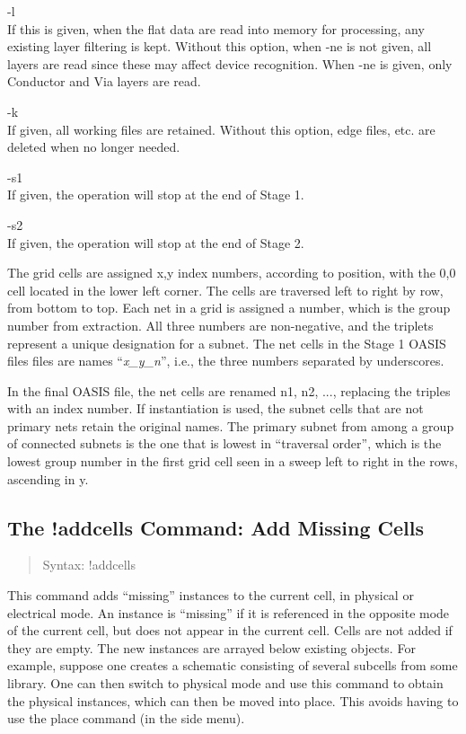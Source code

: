\begin{description}
\item{\vt -l}\\
If this is given, when the flat data are read into memory for
processing, any existing layer filtering is kept.  Without this
option, when {\vt -ne} is not given, all layers are read since these
may affect device recognition.  When {\vt -ne} is given, only
{\et Conductor} and {\et Via} layers are read.

\item{\vt -k}\\
If given, all working files are retained.  Without this option, edge
files, etc.  are deleted when no longer needed.

\item{\vt -s1}\\
If given, the operation will stop at the end of Stage 1.

\item{\vt -s2}\\
If given, the operation will stop at the end of Stage 2.
\end{description}

The grid cells are assigned x,y index numbers, according to position,
with the 0,0 cell located in the lower left corner.  The cells are
traversed left to right by row, from bottom to top.  Each net in a
grid is assigned a number, which is the group number from extraction. 
All three numbers are non-negative, and the triplets represent a
unique designation for a subnet.  The net cells in the Stage 1 OASIS
files files are names ``{\it x\_y\_n\/}'', i.e., the three numbers
separated by underscores.

In the final OASIS file, the net cells are renamed {\vt n1}, {\vt n2},
..., replacing the triples with an index number.  If instantiation is
used, the subnet cells that are not primary nets retain the original
names.  The primary subnet from among a group of connected subnets is
the one that is lowest in ``traversal order'', which is the lowest
group number in the first grid cell seen in a sweep left to right in
the rows, ascending in y.

\subsection{The {\cb !addcells} Command: Add Missing Cells}
\begin{quote}
Syntax: {\vt !addcells}
\end{quote}
This command adds ``missing'' instances to the current cell, in
physical or electrical mode.  An instance is ``missing'' if it is
referenced in the opposite mode of the current cell, but does not
appear in the current cell.  Cells are not added if they are empty. 
The new instances are arrayed below existing objects.  For example,
suppose one creates a schematic consisting of several subcells from
some library.  One can then switch to physical mode and use this
command to obtain the physical instances, which can then be moved into
place.  This avoids having to use the {\cb place} command (in the side
menu).

